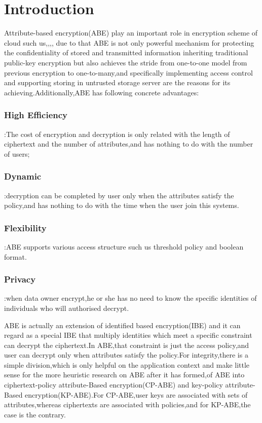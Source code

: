 \section{Introduction}
Attribute-based encryption(ABE) play an important role in encryption scheme of cloud such us\cite{Li Ming:tpds},\cite{other:12},\cite{kp:11},\cite{policy:16},\cite{other:20} due to that ABE is not only powerful mechanism for protecting the confidentiality of stored and transmitted information inheriting traditional public-key encryption but also achieves the stride from one-to-one model from previous encryption to one-to-many\cite{cp:expressive},and specifically implementing access control and supporting storing in untrusted storage server are the reasons for its achieving.Additionally,ABE has following concrete advantages:\subsubsection{High Efficiency}:The cost of encryption and decryption is only related with the length of ciphertext and the number of attributes,and has nothing to do with the number of users;\subsubsection{Dynamic}:decryption can be completed by user only when the attributes satisfy the policy,and has nothing to do with the time when the user join this systems.\subsubsection{Flexibility}:ABE supports various access structure such us threshold policy and boolean format.\subsubsection{Privacy}:when data owner encrypt,he or she has no need to know the specific identities of individuals who will authorised decrypt\cite{Feng:survey}.

ABE is actually an extension of identified based encryption(IBE) and it can regard as a special IBE that multiply identities which meet a specific constraint can decrypt the ciphertext.In ABE,that constraint is just the access policy,and user can decrypt only when attributes satisfy the policy.For integrity,there is a simple division,which is only helpful on the application context and make little sense for the more heuristic research on ABE after it has formed,of ABE into ciphertext-policy attribute-Based encryption(CP-ABE) and key-policy attribute-Based encryption(KP-ABE).For CP-ABE,user keys are associated with sets of attributes,whereas ciphertexts are associated with policies,and for KP-ABE,the case is the contrary.

